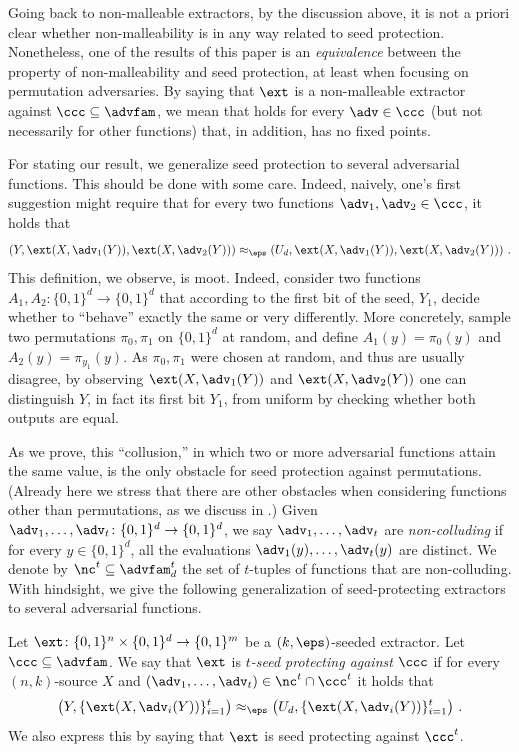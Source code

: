 \documentclass{toc}
\begin{document}
Going back to non-malleable extractors, by the discussion above, it is not a priori clear whether non-malleability is in any way related to seed protection. Nonetheless, one of the results of %
this paper %
is an \emph{equivalence} between the property of non-malleability and seed protection, at least when focusing on permutation adversaries. By saying that $\ext$ is a non-malleable extractor against $\ccc \subseteq \advfam$, we mean that  holds for every $\adv \in \ccc$ (but not necessarily for other functions) that, in addition, has no fixed points. 

For stating our result, we generalize seed protection to several adversarial functions. This should be done with some care. Indeed, naively, one's first suggestion might require that for every two functions $\adv_1,\adv_2 \in \ccc$, it holds that
\[
\left(Y, \ext(X,\adv_1(Y)),\ext(X,\adv_2(Y))\right) \approx_\eps \left(U_d, \ext(X,\adv_1(Y)),\ext(X,\adv_2(Y))\right)\,.
\]
This definition, we observe, is moot. Indeed, consider two functions $A_1, A_2 \colon \{0,1\}^d \to \{0,1\}^d$ that according to the first bit of the seed, $Y_1$, decide whether to ``behave'' exactly the same or very differently. More concretely, sample two permutations $\pi_0,\pi_1$ on $\{0,1\}^d$ at random, and define $A_1(y) = \pi_0(y)$ and $A_2(y) = \pi_{y_1}(y)$.
As $\pi_0,\pi_1$ were chosen at random, and thus are usually disagree, by observing $\ext(X,\adv_1(Y))$ and $\ext(X,\adv_2(Y))$ one can distinguish $Y$, in fact its first bit $Y_1$, from uniform by checking whether both outputs are equal.

As we prove, this %
``collusion,''  %
%
in which two or more  %
adversarial functions attain the same value, is the only obstacle for seed protection against permutations.  %
%
(Already  %
here we stress that there are other obstacles when considering functions other than permutations, as we discuss
in .) %
%
Given $\adv_1,\ldots,\adv_t \colon \{0,1\}^d \rightarrow \{0,1\}^d$, we say $\adv_1,\ldots,\adv_t$ are
\emph{non-colluding} if for every $y \in \{0,1\}^d$, all the evaluations $\adv_1(y),\ldots,\adv_{t}(y)$ are distinct. We denote by $\nc^t \subseteq \advfam^t_d$ the set of $t$-tuples of functions that are non-colluding.
%
%
%
%
With hindsight, we give the following generalization of seed-protecting extractors to several adversarial functions.

\begin{definition}
Let $\ext \colon \{0,1\}^n \times \{0,1\}^d \to \{0,1\}^m$ be a $(k,\eps)$-seeded extractor. Let $\ccc \subseteq \advfam$. We say that $\ext$ is \emph{$t$-seed protecting against $\ccc$}
if for every $(n,k)$-source $X$ and $(\adv_1,\ldots,\adv_t) \in \nc^t \cap \ccc^t$ it holds that
\[
\left(Y, \{\ext(X,\adv_i(Y))\}_{i=1}^{t}\right) \approx_\eps \left(U_d, \{\ext(X,\adv_i(Y))\}_{i=1}^{t}\right)\,.
\]
We also express this by saying that $\ext$ is seed protecting against $\ccc^t$.
\end{definition}
\end{document}
